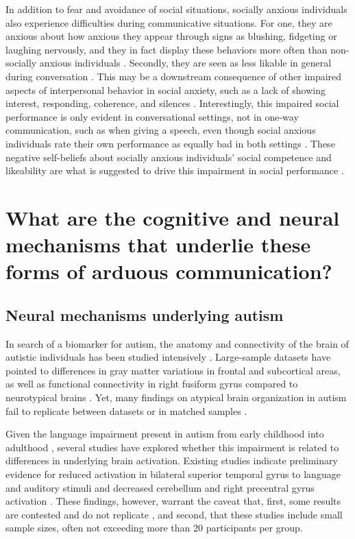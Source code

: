 In addition to fear and avoidance of social situations, socially anxious individuals also experience difficulties during communicative situations. For one, they are anxious about how anxious they appear through signs as blushing, fidgeting or laughing nervously, and they in fact display these behaviors more often than non-socially anxious individuals \citep{voncken2008JAD}. Secondly, they are seen as less likable in general during conversation \citep{alden1995,creed1998,meleshko1993,voncken2008BJCP}. This may be a downstream consequence of other impaired aspects of interpersonal behavior in social anxiety, such as a lack of showing interest, responding, coherence, and silences \citep{voncken2008JAD}. Interestingly, this impaired social performance is only evident in conversational settings, not in one-way communication, such as when giving a speech, even though social anxious individuals rate their own performance as equally bad in both settings \citep{voncken2008JAD}. These negative self-beliefs about socially anxious individuals’ social competence and likeability are what is suggested to drive this impairment in social performance \citep{voncken2010}.

\section{What are the cognitive and neural mechanisms that underlie these forms of arduous communication?}

\subsection{Neural mechanisms underlying autism}

In search of a biomarker for autism, the anatomy and connectivity of the brain of autistic individuals has been studied intensively \citep[for a review]{pretzsch2022}. Large-sample datasets have pointed to differences in gray matter variations in frontal and subcortical areas, as well as functional connectivity in right fusiform gyrus compared to neurotypical brains \citep{mei2020,oblong2023}. Yet, many findings on atypical brain organization in autism fail to replicate between datasets or in matched samples \citep{he2020,koldewyn2014,mei2024,riddle2017}. 

Given the language impairment present in autism from early childhood into adulthood \citep{velikonja2019}, several studies have explored whether this impairment is related to differences in underlying brain activation. Existing studies indicate preliminary evidence for reduced activation in bilateral superior temporal gyrus to language and auditory stimuli and decreased cerebellum and right precentral gyrus activation \citep[for reviews]{groen2008,philip2012}. These findings, however, warrant the caveat that, first, some results are contested and do not replicate \citep{tryfon2018}, and second, that these studies include small sample sizes, often not exceeding more than 20 participants per group.

